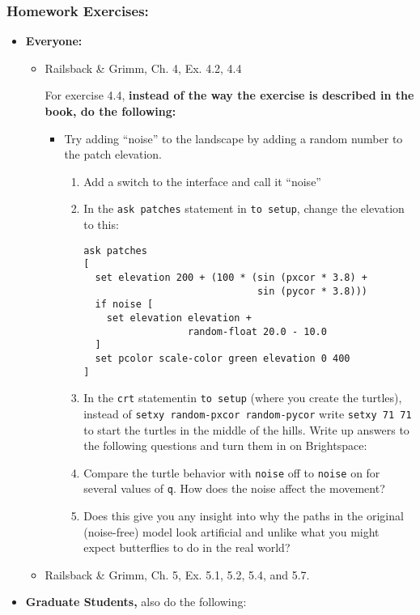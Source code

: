 \documentclass[
]{article}
\providecommand{\tightlist}{%
  \setlength{\itemsep}{0pt}\setlength{\parskip}{0pt}}
\begin{document}
\hypertarget{homework-exercises-4}{%
\subsubsection{Homework Exercises:}\label{homework-exercises-4}}

\begin{itemize}
\tightlist
\item
  \textbf{Everyone:}

  \begin{itemize}
  \item
    Railsback \& Grimm, Ch. 4, Ex. 4.2, 4.4

    For exercise 4.4, \textbf{instead of the way the exercise is
    described in the book, do the following:}

    \begin{itemize}
    \tightlist
    \item
      Try adding ``noise'' to the landscape by adding a random number to
      the patch elevation.

      \begin{enumerate}
      \def\labelenumi{\arabic{enumi}.}
      \item
        Add a switch to the interface and call it ``noise''
      \item
        In the \texttt{ask\ patches} statement in \texttt{to\ setup},
        change the elevation to this:

\begin{verbatim}
ask patches
[
  set elevation 200 + (100 * (sin (pxcor * 3.8) +
                              sin (pycor * 3.8)))
  if noise [
    set elevation elevation +
                  random-float 20.0 - 10.0
  ]
  set pcolor scale-color green elevation 0 400
]
\end{verbatim}
      \item
        In the \texttt{crt} statementin \texttt{to\ setup} (where you
        create the turtles), instead of
        \texttt{setxy\ random-pxcor\ random-pycor} write
        \texttt{setxy\ 71\ 71} to start the turtles in the middle of the
        hills. Write up answers to the following questions and turn them
        in on Brightspace:
      \item
        Compare the turtle behavior with \texttt{noise} off to
        \texttt{noise} on for several values of \texttt{q}. How does the
        noise affect the movement?
      \item
        Does this give you any insight into why the paths in the
        original (noise-free) model look artificial and unlike what you
        might expect butterflies to do in the real world?
      \end{enumerate}
    \end{itemize}
  \item
    Railsback \& Grimm, Ch. 5, Ex. 5.1, 5.2, 5.4, and 5.7.
  \end{itemize}
\item
  \textbf{Graduate Students,} also do the following:


\end{itemize}
\end{document}

